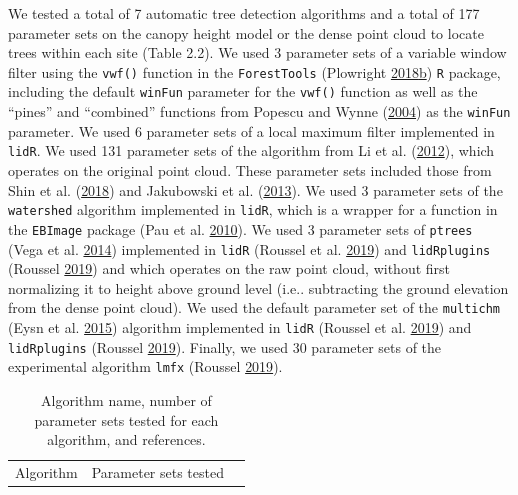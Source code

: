 \documentclass[twoside,12pt,final]{ucthesis-CA2012}
\begin{document}
\begin{ucmainmatter}
We tested a total of 7 automatic tree detection algorithms and a total
of 177 parameter sets on the canopy height model or the dense point
cloud to locate trees within each site (Table 2.2). We used 3 parameter
sets of a variable window filter using the \texttt{vwf()} function in
the \texttt{ForestTools} (Plowright
\protect\hyperlink{ref-plowright2018}{2018}\protect\hyperlink{ref-plowright2018}{b})
\texttt{R} package, including the default \texttt{winFun} parameter for
the \texttt{vwf()} function as well as the ``pines'' and ``combined''
functions from Popescu and Wynne
(\protect\hyperlink{ref-popescu2004}{2004}) as the \texttt{winFun}
parameter. We used 6 parameter sets of a local maximum filter
implemented in \texttt{lidR}. We used 131 parameter sets of the
algorithm from Li et al. (\protect\hyperlink{ref-li2012}{2012}), which
operates on the original point cloud. These parameter sets included
those from Shin et al. (\protect\hyperlink{ref-shin2018}{2018}) and
Jakubowski et al. (\protect\hyperlink{ref-jakubowski2013}{2013}). We
used 3 parameter sets of the \texttt{watershed} algorithm implemented in
\texttt{lidR}, which is a wrapper for a function in the \texttt{EBImage}
package (Pau et al. \protect\hyperlink{ref-pau2010}{2010}). We used 3
parameter sets of \texttt{ptrees} (Vega et al.
\protect\hyperlink{ref-vega2014}{2014}) implemented in \texttt{lidR}
(Roussel et al. \protect\hyperlink{ref-roussel2019}{2019}) and
\texttt{lidRplugins} (Roussel
\protect\hyperlink{ref-roussel2019a}{2019}) and which operates on the
raw point cloud, without first normalizing it to height above ground
level (i.e.. subtracting the ground elevation from the dense point
cloud). We used the default parameter set of the \texttt{multichm} (Eysn
et al. \protect\hyperlink{ref-eysn2015}{2015}) algorithm implemented in
\texttt{lidR} (Roussel et al. \protect\hyperlink{ref-roussel2019}{2019})
and \texttt{lidRplugins} (Roussel
\protect\hyperlink{ref-roussel2019a}{2019}). Finally, we used 30
parameter sets of the experimental algorithm \texttt{lmfx} (Roussel
\protect\hyperlink{ref-roussel2019a}{2019}).
\begin{longtable}[]{@{}ccc@{}}
\caption{Algorithm name, number of parameter sets tested for each
algorithm, and references.}\tabularnewline
\toprule
\begin{minipage}[b]{0.18\columnwidth}\centering\strut
Algorithm\strut
\end{minipage} & \begin{minipage}[b]{0.22\columnwidth}\centering\strut
Parameter sets tested\strut
\end{minipage} & \begin{minipage}[b]{0.34\columnwidth}\centering\strut

\end{minipage}
\end{longtable}
\end{ucmainmatter}
\end{document}
